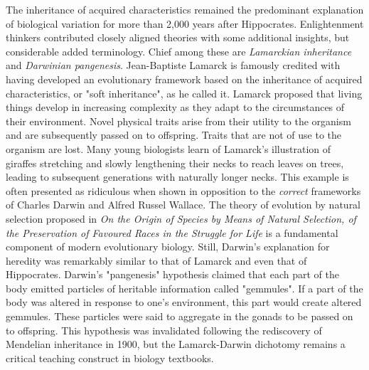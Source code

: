 The inheritance of acquired characteristics remained the predominant explanation of biological variation for more than 2,000 years after Hippocrates. Enlightenment thinkers contributed closely aligned theories with some additional insights, but considerable added terminology. Chief among these are \textit{Lamarckian inheritance} and \textit{Darwinian pangenesis}. Jean-Baptiste Lamarck is famously credited with having developed an evolutionary framework based on the inheritance of acquired characteristics, or "soft inheritance", as he called it.  \cite{lamarck_1914} Lamarck proposed that living things develop in increasing complexity as they adapt to the circumstances of their environment. Novel physical traits arise from their utility to the organism and are subsequently passed on to offspring. Traits that are not of use to the organism are lost. Many young biologists learn of Lamarck's illustration of giraffes stretching and slowly lengthening their necks to reach leaves on trees, leading to subsequent generations with naturally longer necks. This example is often presented as ridiculous when shown in opposition to the \textit{correct} frameworks of Charles Darwin and Alfred Russel Wallace. The theory of evolution by natural selection proposed in \textit{On the Origin of Species by Means of Natural Selection, of the Preservation of Favoured Races in the Struggle for Life} is a fundamental component of modern evolutionary biology. \cite{darwin_1859} Still, Darwin's explanation for heredity was remarkably similar to that of Lamarck and even that of Hippocrates. Darwin's "pangenesis" hypothesis claimed that each part of the body emitted particles of heritable information called "gemmules".\cite{darwin_1868}  If a part of the body was altered in response to one's environment, this part would create altered gemmules. \cite{darwin_pangenesis_1871} These particles were said to aggregate in the gonads to be passed on to offspring.  This hypothesis was invalidated following the rediscovery of Mendelian inheritance in 1900, but the Lamarck-Darwin dichotomy remains a critical teaching construct in biology textbooks. \cite{holterhoff_history_2014} \cite{zirkle_inheritance_1935}


